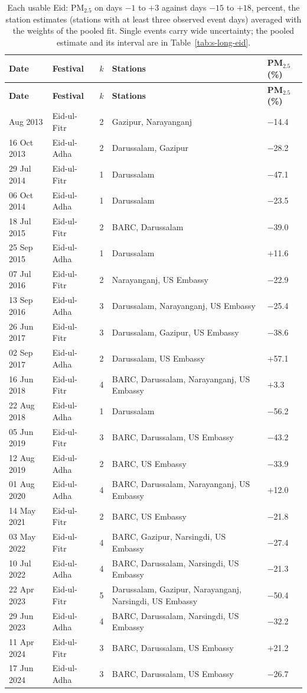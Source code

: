 \begingroup\scriptsize
\begin{longtable}{L{2.2cm} L{2.2cm} C{0.5cm} L{6.4cm} C{2.0cm}}
\caption{Each usable Eid: PM$_{2.5}$ on days $-1$ to $+3$ against days $-15$ to $+18$, percent, the station estimates (stations with at least three observed event days) averaged with the weights of the pooled fit. Single events carry wide uncertainty; the pooled estimate and its interval are in Table~\ref{tab:s-long-eid}.}\label{tab:s-long-eid-event}\\
\toprule
\textbf{Date} & \textbf{Festival} & \textbf{$k$} & \textbf{Stations} & \textbf{PM$_{2.5}$ (\%)} \\
\midrule\endfirsthead
\toprule
\textbf{Date} & \textbf{Festival} & \textbf{$k$} & \textbf{Stations} & \textbf{PM$_{2.5}$ (\%)} \\
\midrule\endhead
\bottomrule{} Aug 2013 & Eid-ul-Fitr & 2 & Gazipur, Narayanganj & $-$14.4 \\
16 Oct 2013 & Eid-ul-Adha & 2 & Darussalam, Gazipur & $-$28.2 \\
29 Jul 2014 & Eid-ul-Fitr & 1 & Darussalam & $-$47.1 \\
06 Oct 2014 & Eid-ul-Adha & 1 & Darussalam & $-$23.5 \\
18 Jul 2015 & Eid-ul-Fitr & 2 & BARC, Darussalam & $-$39.0 \\
25 Sep 2015 & Eid-ul-Adha & 1 & Darussalam & $+$11.6 \\
07 Jul 2016 & Eid-ul-Fitr & 2 & Narayanganj, US Embassy & $-$22.9 \\
13 Sep 2016 & Eid-ul-Adha & 3 & Darussalam, Narayanganj, US Embassy & $-$25.4 \\
26 Jun 2017 & Eid-ul-Fitr & 3 & Darussalam, Gazipur, US Embassy & $-$38.6 \\
02 Sep 2017 & Eid-ul-Adha & 2 & Darussalam, US Embassy & $+$57.1 \\
16 Jun 2018 & Eid-ul-Fitr & 4 & BARC, Darussalam, Narayanganj, US Embassy & $+$3.3 \\
22 Aug 2018 & Eid-ul-Adha & 1 & Darussalam & $-$56.2 \\
05 Jun 2019 & Eid-ul-Fitr & 3 & BARC, Darussalam, US Embassy & $-$43.2 \\
12 Aug 2019 & Eid-ul-Adha & 2 & BARC, US Embassy & $-$33.9 \\
01 Aug 2020 & Eid-ul-Adha & 4 & BARC, Darussalam, Narayanganj, US Embassy & $+$12.0 \\
14 May 2021 & Eid-ul-Fitr & 2 & BARC, US Embassy & $-$21.8 \\
03 May 2022 & Eid-ul-Fitr & 4 & BARC, Gazipur, Narsingdi, US Embassy & $-$27.4 \\
10 Jul 2022 & Eid-ul-Adha & 4 & BARC, Darussalam, Narsingdi, US Embassy & $-$21.3 \\
22 Apr 2023 & Eid-ul-Fitr & 5 & Darussalam, Gazipur, Narayanganj, Narsingdi, US Embassy & $-$50.4 \\
29 Jun 2023 & Eid-ul-Adha & 4 & BARC, Darussalam, Narsingdi, US Embassy & $-$32.2 \\
11 Apr 2024 & Eid-ul-Fitr & 3 & BARC, Darussalam, US Embassy & $+$21.2 \\
17 Jun 2024 & Eid-ul-Adha & 3 & BARC, Darussalam, US Embassy & $-$26.7 \\
\end{longtable}
\endgroup
